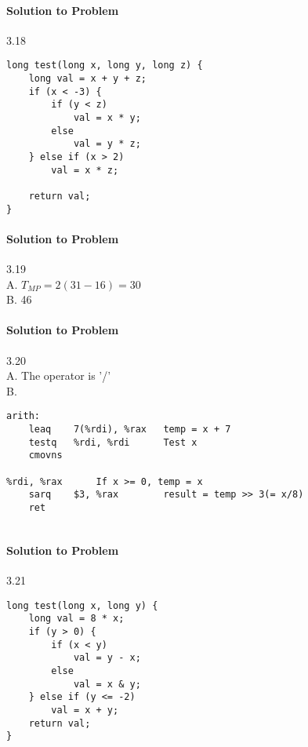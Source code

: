 \documentclass{report}
\begin{document}
\paragraph{Solution to Problem } 3.18 \\
\begin{lstlisting}
long test(long x, long y, long z) {
    long val = x + y + z;
    if (x < -3) {
        if (y < z) 
            val = x * y;
        else
            val = y * z;
    } else if (x > 2) 
        val = x * z;
    
    return val;
}
\end{lstlisting}

\paragraph{Solution to Problem } 3.19 \\
A. $T_{MP} = 2(31-16) = 30$ \\
B. 46

\paragraph{Solution to Problem } 3.20 \\
A. The operator is '/' \\
B.
\begin{lstlisting}
arith:
    leaq    7(%rdi), %rax   temp = x + 7
    testq   %rdi, %rdi      Test x
    cmovns

%rdi, %rax      If x >= 0, temp = x
    sarq    $3, %rax        result = temp >> 3(= x/8)
    ret
    
\end{lstlisting}

\paragraph{Solution to Problem } 3.21 \\
\begin{lstlisting}
long test(long x, long y) {
    long val = 8 * x;
    if (y > 0) {
        if (x < y) 
            val = y - x;
        else
            val = x & y;
    } else if (y <= -2) 
        val = x + y;
    return val;
}
\end{lstlisting}
\end{document}
